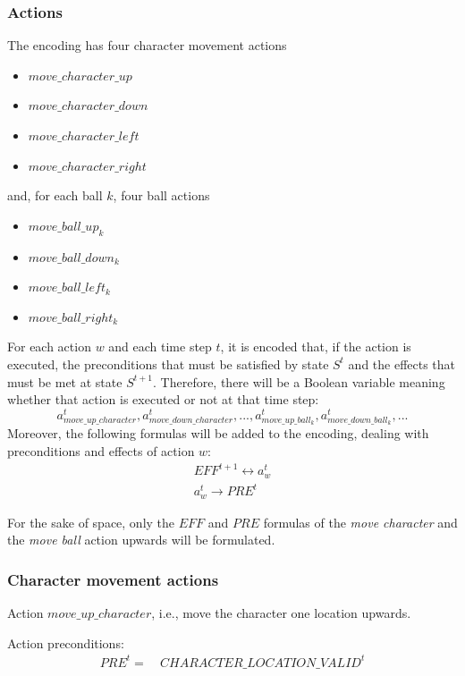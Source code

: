 \documentclass{report}
\theoremstyle{plain}
\begin{document}
\subsubsection{Actions}
The encoding has four character movement actions
\begin{itemize}
    \item $move\_character\_up$
    \item $move\_character\_down$
    \item $move\_character\_left$
    \item $move\_character\_right$
\end{itemize}
and, for each ball $k$, four ball actions
\begin{itemize}
    \item $move\_ball\_up_k$
    \item $move\_ball\_down_k$
    \item $move\_ball\_left_k$
    \item $move\_ball\_right_k$
\end{itemize}

\vspace{1\baselineskip}

For each action $w$ and each time step $t$, it is encoded that, if the action is executed, the preconditions that must be satisfied by state $S^t$ and the effects that must be met at state $S^{t+1}$. Therefore, there will be a Boolean variable meaning whether that action is executed or not at that time step:
$$a_{move\_up\_character}^t, a_{move\_down\_character}^t, ...,  a_{move\_up\_ball_k}^t, a_{move\_down\_ball_k}^t, ...$$
Moreover, the following formulas will be added to the encoding, dealing with preconditions and effects of action $w$:
\begin{align*}
EFF^{t+1} \leftrightarrow a_w^t \\
a_w^t \rightarrow PRE^t
\end{align*}

For the sake of space, only the $EFF$ and $PRE$ formulas of the \emph{move character} and the \emph{move ball} action upwards will be formulated.
\subsubsection{Character movement actions}
Action $move\_up\_character$, i.e., move the character one location upwards.

Action preconditions:
\begin{align*}
PRE^t = \ & CHARACTER\_LOCATION\_VALID^t 
\end{align*}
\end{document}

